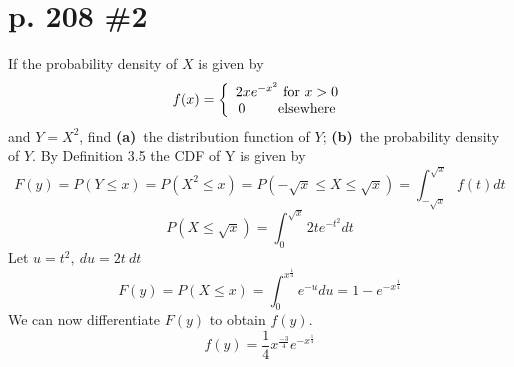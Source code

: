 \documentclass[12pt]{article}
\begin{document}
	\section[20pt]{p. 208 \#2}
	If the probability density of \(X\) is given by
	\[f(x)=\left\{\begin{array}{ccc}
	2xe^{-x^2}\ \textup{for }x>0\\0 \ \ \ \ \ \ \ \textup{elsewhere}
	\end{array}\right.\]
	and \(Y=X^2\), find \newline
	\textbf{(a)}\ the distribution function of \(Y\);
	\textbf{(b)}\ the probability density of \(Y\).
	\newline \newline
	By Definition 3.5 the CDF of Y is given by
	\[F(y)=P(Y\leq x)=P(X^2\leq x)=P(-\sqrt{x}\leq X\leq \sqrt{x})=\int_{-\sqrt{x}}^{\sqrt{x}}f(t)dt\]
	\[P(X\leq \sqrt{x})=\int_{0}^{\sqrt{x}}2te^{-t^2}dt\]
	Let \(u=t^2,\ du=2t\ dt\)
	\[F(y)=P(X\leq x)=\int_{0}^{x^{\frac{1}{4}}}e^{-u}du=1-e^{-{x^{\frac{1}{4}}}}\]
	We can now differentiate \(F(y)\) to obtain \(f(y)\).
	\[f(y)=\frac{1}{4}x^{\frac{-3}{4}}e^{-{x^{\frac{1}{4}}}}\]
\end{document}
